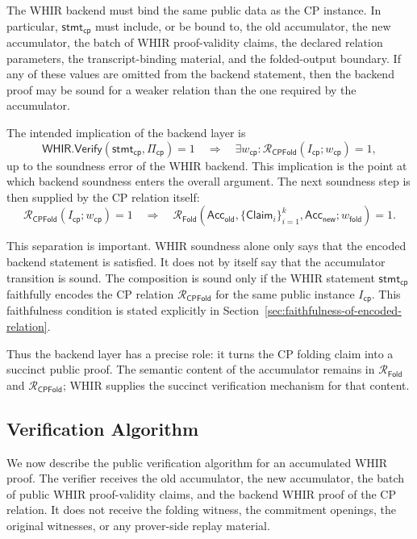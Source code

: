 \documentclass[11pt]{article}
\theoremstyle{definition}
\newcommand{\WHIR}{\mathsf{WHIR}}
\newcommand{\Acc}{\mathsf{Acc}}
\newcommand{\Verify}{\mathsf{Verify}}
\newcommand{\Rfold}{\mathcal{R}_{\mathsf{Fold}}}
\newcommand{\Rcp}{\mathcal{R}_{\mathsf{CPFold}}}
\begin{document}
The WHIR backend must bind the same public data as the CP instance. In
particular, $\mathsf{stmt}_{\mathsf{cp}}$ must include, or be bound to, the old
accumulator, the new accumulator, the batch of WHIR proof-validity claims, the
declared relation parameters, the transcript-binding material, and the
folded-output boundary. If any of these values are omitted from the backend
statement, then the backend proof may be sound for a weaker relation than the
one required by the accumulator.

The intended implication of the backend layer is
\[
  \WHIR.\Verify(\mathsf{stmt}_{\mathsf{cp}},\Pi_{\mathsf{cp}})=1
  \quad\Longrightarrow\quad
  \exists w_{\mathsf{cp}} :
  \Rcp(I_{\mathsf{cp}};w_{\mathsf{cp}})=1,
\]
up to the soundness error of the WHIR backend. This implication is the point at
which backend soundness enters the overall argument. The next soundness step is
then supplied by the CP relation itself:
\[
  \Rcp(I_{\mathsf{cp}};w_{\mathsf{cp}})=1
  \quad\Longrightarrow\quad
  \Rfold\!\left(
    \Acc_{\mathsf{old}},
    \{\mathsf{Claim}_i\}_{i=1}^k,
    \Acc_{\mathsf{new}};
    w_{\mathsf{fold}}
  \right)=1.
\]

This separation is important. WHIR soundness alone only says that the encoded
backend statement is satisfied. It does not by itself say that the accumulator
transition is sound. The composition is sound only if the WHIR statement
$\mathsf{stmt}_{\mathsf{cp}}$ faithfully encodes the CP relation $\Rcp$ for the
same public instance $I_{\mathsf{cp}}$. This faithfulness condition is stated
explicitly in Section~\ref{sec:faithfulness-of-encoded-relation}.

Thus the backend layer has a precise role: it turns the CP folding claim into a
succinct public proof. The semantic content of the accumulator remains in
$\Rfold$ and $\Rcp$; WHIR supplies the succinct verification mechanism for that
content.

\subsection{Verification Algorithm}
\label{sec:verification-algorithm}

We now describe the public verification algorithm for an accumulated WHIR proof.
The verifier receives the old accumulator, the new accumulator, the batch of
public WHIR proof-validity claims, and the backend WHIR proof of the CP relation.
It does not receive the folding witness, the commitment openings, the original
witnesses, or any prover-side replay material.
\end{document}
